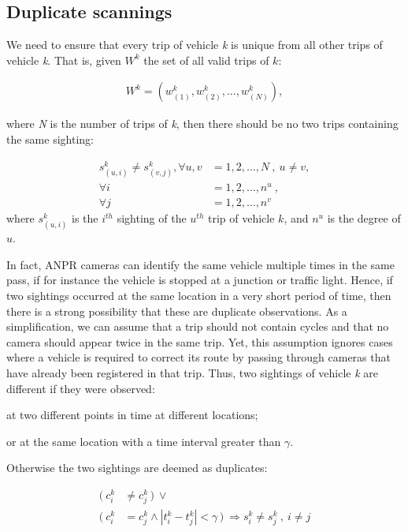 \subsection{Duplicate scannings}

We need to ensure that every trip of vehicle \emph{k} is unique from all other trips of vehicle \emph{k}. That is, given $W^k$ the set of all valid trips of $k$:

\begin{align}
W^{k} = \left( w^{k}_{(1)}, w^{k}_{(2)}, \ldots, w^{k}_{(N)} \right) \label{e.trip.history},
\end{align}

where \emph{N} is the number of trips of \emph{k}, then there should be no two trips containing the same sighting:

\vspace{-0.5cm}
\begin{align}
s^{k}_{(u,i)} \neq s^{k}_{(v,j)}, \forall u,v &= 1, 2, \ldots, N \ , \ u \neq v,  \label{e.trip.history.constraint} \\
\forall i &= 1, 2, \ldots, n^u \ , \\
\forall j &= 1, 2, \ldots, n^v \  \nonumber
\end{align}
where $s_{(u,i)}^k$ is the $i^{th}$ sighting of the $u^{th}$ trip of vehicle $k$, and $n^u$ is the degree of $u$.

In fact, ANPR cameras can identify the same vehicle multiple times in the same pass, if for instance the vehicle is stopped at a junction or traffic light. Hence, if two sightings occurred at the same location in a very short period of time, then there is a strong possibility that these are duplicate observations. As a simplification, we can assume that a trip should not contain cycles and that no camera should appear twice in the same trip. Yet, this assumption ignores cases where a vehicle is required to correct its route by passing through cameras that have already been registered in that trip. Thus, two sightings of vehicle \emph{k} are different if they were observed:
\begin{enumerate*}[label=(\roman*)]
  \item at two different points in time at different locations;
  \item or at the same location with a time interval greater than $\gamma$.
\end{enumerate*}
Otherwise the two sightings are deemed as duplicates:

\vspace{-0.5cm}
\begin{align} \label{e.sighting.different.2}
 (\ c^{k}_{i} &\ne c^{k}_{j} \, )\ \vee \\
 (\ c^{k}_{i} &= c^{k}_{j} \wedge |t^{k}_{i} - t^{k}_{j}| < \gamma \, )\ \Rightarrow s^{k}_{i} \ne s^{k}_{j}  \ , \ i \ne j \nonumber
\end{align}

